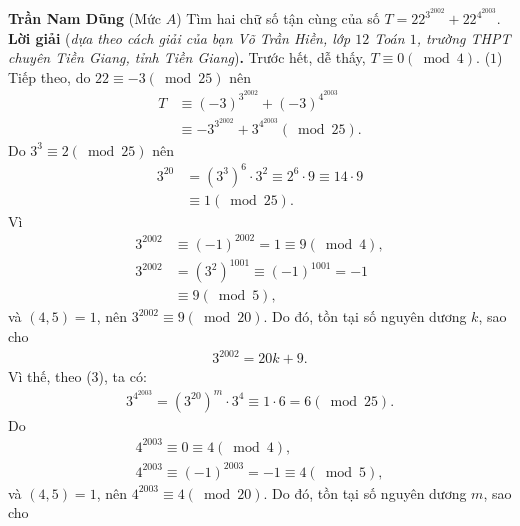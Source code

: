\begin{multicols}{2}
	\vskip 0.05cm
	\hfill	\textbf{\color{thachthuctoanhoc}Trần Nam Dũng}
	\vskip 0.05cm
	{}
	(Mức $A$) Tìm hai chữ số tận cùng của số $T=22^{3^{2002}}+22^{4^{2003}}$.
	\vskip 0.05cm
	\textbf{\color{thachthuctoanhoc}Lời giải} (\textit{dựa theo cách giải của bạn Võ Trần Hiền, lớp $12$ Toán $1$, trường THPT chuyên Tiền Giang, tỉnh Tiền Giang})\textbf{\color{thachthuctoanhoc}.}
	\vskip 0.05cm
	Trước hết, dễ thấy, $T \equiv 0\left( {\bmod 4} \right)$. \hfill ($1$)
	\vskip 0.05cm
	Tiếp theo, do  $22 \equiv  - 3\left( {\bmod 25} \right)$ nên
	\begin{align*}
		T &\equiv {\left( { - 3} \right)^{{3^{2002}}}} + {\left( { - 3} \right)^{{4^{2003}}}} \\
		&\equiv  - {3^{{3^{2002}}}} + {3^{{4^{2003}}}}\left( {\bmod 25} \right). \tag{$2$}
	\end{align*}
	Do  ${3^3} \equiv 2\left( {\bmod 25} \right)$ nên
	\begin{align*}
		{3^{20}} &= {\left( {{3^3}} \right)^6} \cdot {3^2} \equiv {2^6} \cdot 9 \equiv 14 \cdot 9 \\
		&\equiv 1\left( {\bmod 25} \right). \tag{$3$}
	\end{align*}
	Vì
	\begin{align*}
		{3^{2002}} &\equiv {\left( { - 1} \right)^{2002}} = 1 \equiv 9\left( {\bmod 4} \right),\\
		{3^{2002}} &= {\left( {{3^2}} \right)^{1001}} \equiv {\left( { - 1} \right)^{1001}} =  - 1 \\
		&\equiv 9\left( {\bmod 5} \right),
	\end{align*}
	và $(4, 5) = 1$, nên ${3^{2002}} \equiv 9\left( {\bmod 20} \right)$.  Do đó, tồn tại số nguyên dương $k$, sao cho
	\begin{align*}
		{3^{2002}} = 20k + 9.
	\end{align*}
	Vì thế, theo ($3$), ta có:
	\begin{align*}
		{3^{{4^{2003}}}} \!\!=\!\! {\left( {{3^{20}}} \right)^m} \!\!\cdot\! {3^4} \!\equiv\! 1 \!\!\cdot\! 6 \!=\! 6\left(\! {\bmod 25} \right)\!\!. \tag{$4$}
	\end{align*}
	Do
	\begin{align*}
		{4^{2003}} \equiv 0 \equiv 4\left( {\bmod 4} \right),\\
		{4^{2003}} \equiv {\left( { - 1} \right)^{2003}} =  - 1 \equiv 4\left( {\bmod 5} \right),
	\end{align*}
	và $(4, 5) = 1$, nên ${4^{2003}} \equiv 4\left( {\bmod 20} \right)$.  Do đó, tồn tại số nguyên dương $m$, sao cho

\end{multicols}
